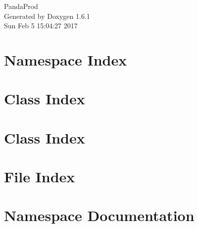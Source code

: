 \documentclass[a4paper]{book}
\begin{document}
\hypersetup{pageanchor=false}
\begin{titlepage}
\vspace*{7cm}
\begin{center}
{\Large PandaProd }\\
\vspace*{1cm}
{\large Generated by Doxygen 1.6.1}\\
\vspace*{0.5cm}
{\small Sun Feb 5 15:04:27 2017}\\
\end{center}
\end{titlepage}
\clearemptydoublepage
{}
\tableofcontents
\clearemptydoublepage
{}
\hypersetup{pageanchor=true}
\chapter{Namespace Index}

\chapter{Class Index}

\chapter{Class Index}

\chapter{File Index}

\chapter{Namespace Documentation}



















\end{document}
